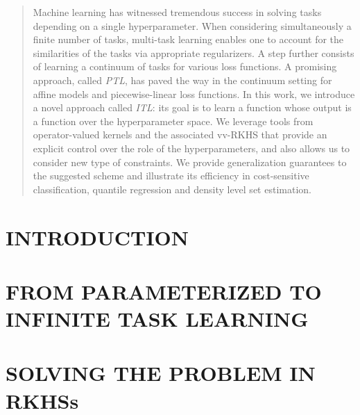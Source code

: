 \begin{abstract}
Machine learning has witnessed tremendous success in solving tasks depending on
a single hyperparameter. When considering simultaneously a finite number of
tasks, multi-task learning enables one to account for the similarities of the tasks
via appropriate regularizers. A step further consists of learning a continuum
of tasks for various loss functions. A promising approach, called
\emph{\acl{PTL}}, has paved the way in the continuum setting for affine models
and piecewise-linear loss functions.  In this work, we introduce a novel
approach called \emph{\acl{ITL}}: its goal is to learn a function whose output
is a function over the hyperparameter space.  We leverage tools from
operator-valued kernels and the associated \acl{vv-RKHS} that provide an
explicit control over the role of the hyperparameters, and also allows us to
consider new type of constraints. We provide generalization guarantees to the
suggested scheme and illustrate its efficiency in cost-sensitive
classification, quantile regression and density level set estimation.
\end{abstract}
%
\section{INTRODUCTION}
\label{section:introduction}

%
\section{FROM PARAMETERIZED TO INFINITE TASK LEARNING}
\label{section:infinite_tasks}

%
\section{SOLVING THE PROBLEM IN \acp{RKHS}}
\label{section:results}

%
% 
% 
%
